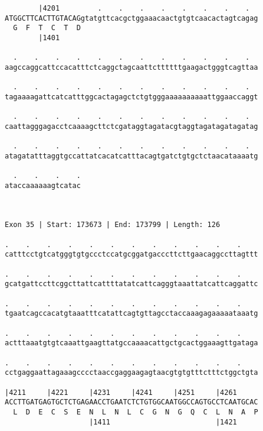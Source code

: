 \documentclass{article}
\begin{document}
\begin{Verbatim}
        |4201         .    .    .    .    .    .    .    .  
ATGGCTTCACTTGTACAGgtatgttcacgctggaaacaactgtgtcaacactagtcagag
  G  F  T  C  T  D                                          
        |1401                                               
  
  .    .    .    .    .    .    .    .    .    .    .    .  
aagccaggcattccacatttctcaggctagcaattcttttttgaagactgggtcagttaa
                                                            
  .    .    .    .    .    .    .    .    .    .    .    .  
tagaaaagattcatcatttggcactagagctctgtgggaaaaaaaaaattggaaccaggt
                                                            
  .    .    .    .    .    .    .    .    .    .    .    .  
caattagggagacctcaaaagcttctcgataggtagatacgtaggtagatagatagatag
                                                            
  .    .    .    .    .    .    .    .    .    .    .    .  
atagatatttaggtgccattatcacatcatttacagtgatctgtgctctaacataaaatg
                                                            
  .    .    .    .
ataccaaaaaagtcatac
                  
                  
 
Exon 35 | Start: 173673 | End: 173799 | Length: 126
 
.    .    .    .    .    .    .    .    .    .    .    .    
catttcctgtcatgggtgtgccctccatgcggatgacccttcttgaacaggccttagttt
                                                            
.    .    .    .    .    .    .    .    .    .    .    .    
gcatgattccttcggcttattcattttatatcattcagggtaaattatcattcaggattc
                                                            
.    .    .    .    .    .    .    .    .    .    .    .    
tgaatcagccacatgtaaatttcatattcagtgttagcctaccaaagagaaaaataaatg
                                                            
.    .    .    .    .    .    .    .    .    .    .    .    
actttaaatgtgtcaaattgaagttatgccaaaacattgctgcactggaaagttgataga
                                                            
.    .    .    .    .    .    .    .    .    .    .    .    
cctgaggaattagaaagcccctaaccgaggaagagtaacgtgtgtttctttctggctgta
                                                            
|4211     |4221     |4231     |4241     |4251     |4261     
ACCTTGATGAGTGCTCTGAGAACCTGAATCTCTGTGGCAATGGCCAGTGCCTCAATGCAC
  L  D  E  C  S  E  N  L  N  L  C  G  N  G  Q  C  L  N  A  P
                    |1411                         |1421     
  

\end{Verbatim}
\end{document}
